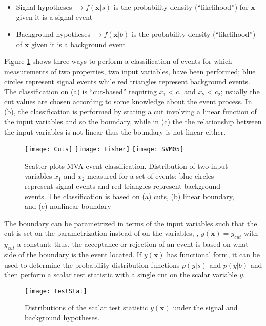 \begin{itemize}
\item Signal hypotheses $\to f(\textbf{x}|s)$ is the probability density (``likelihood'') for $\textbf{x}$ given it is a signal event 
\item Background hypotheses $ \to f(\textbf{x}|b)$ is the probability density (``likelihood'') of $\textbf{x}$ given it is a background event
\end{itemize}

Figure \ref{fig:scatter_plot} shows three ways to perform a classification of events for which measurements of two properties, two input variables, have been performed; blue circles represent signal events while red triangles represent background events. The classification on (a) is ``cut-based'' requiring $x_1<c_1$ and $x_2<c_2$; usually the cut values are chosen according to some knowledge about the event process. In (b), the classification is performed by stating a cut involving a linear function of the input variables and so the boundary, while in (c) the the relationship between the input variables is not linear thus the boundary is not linear either.          

\begin{figure}[!h]
  \centering
  \texttt{[image: Cuts]}
  \texttt{[image: Fisher]}
  \texttt{[image: SVM05]}
  \caption[Scatter plots-MVA event classification.]{Scatter plots-MVA event classification. Distribution of two input variables $x_1$ and $x_2$ measured for a set of events; blue circles represent signal events and red triangles represent background events. The classification is based on (a) cuts, (b) linear boundary, and (c) nonlinear boundary\cite{mva}}\label{fig:scatter_plot}
\end{figure}

The boundary can be parametrized in terms of the input variables such that the cut is set on the parametrization instead of on the variables, \ie, $y(\textbf{x})=y_{cut}$ with $y_{cut}$ a constant; thus, the acceptance or rejection of an event is based on what side of the boundary is the event located. If $y(\textbf{x})$ has functional form, it can be used to determine the probability distribution functions $p(y|s)$ and $p(y|b)$ and then perform a scalar test statistic with a single cut on the scalar variable $y$. 

\begin{figure}[!h]
  \centering
  \texttt{[image: TestStat]}
  \caption[Scalar test statistical.]{Distributions of the scalar test statistic $y(\textbf{x})$ under the signal and background hypotheses.\cite{mva}}\label{fig:scalar_test}
\end{figure}

